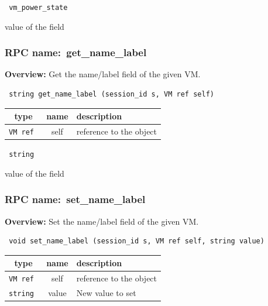 \vspace{0.3cm}

{\tt 
vm\_power\_state
}


value of the field
\vspace{0.3cm}
\vspace{0.3cm}
\vspace{0.3cm}
\subsubsection{RPC name:~get\_name\_label}

{\bf Overview:} 
Get the name/label field of the given VM.

\begin{verbatim} string get_name_label (session_id s, VM ref self)\end{verbatim}



 
\vspace{0.3cm}
\begin{tabular}{|c|c|p{7cm}|}
 \hline
{\bf type} & {\bf name} & {\bf description} \\ \hline
{\tt VM ref } & self & reference to the object \\ \hline 

\end{tabular}

\vspace{0.3cm}

{\tt 
string
}


value of the field
\vspace{0.3cm}
\vspace{0.3cm}
\vspace{0.3cm}
\subsubsection{RPC name:~set\_name\_label}

{\bf Overview:} 
Set the name/label field of the given VM.

\begin{verbatim} void set_name_label (session_id s, VM ref self, string value)\end{verbatim}



 
\vspace{0.3cm}
\begin{tabular}{|c|c|p{7cm}|}
 \hline
{\bf type} & {\bf name} & {\bf description} \\ \hline
{\tt VM ref } & self & reference to the object \\ \hline 

{\tt string } & value & New value to set \\ \hline 

\end{tabular}

